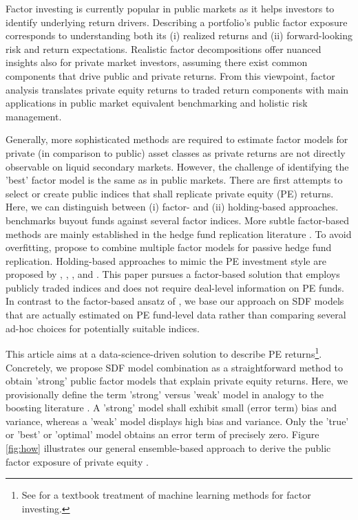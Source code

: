 \documentclass[12pt]{article}
\begin{document}
Factor investing is currently popular in public markets as it helps investors to identify underlying return drivers.
Describing a portfolio's public factor exposure corresponds to understanding both its (i) realized returns and (ii) forward-looking risk and return expectations.
Realistic factor decompositions offer nuanced insights also for private market investors, assuming there exist common components that drive public and private returns.
From this viewpoint, factor analysis translates private equity returns to traded return components with main applications in public market equivalent benchmarking and holistic risk management.

Generally, more sophisticated methods are required to estimate factor models for private (in comparison to public) asset classes as private returns are not directly observable on liquid secondary markets.
However, the challenge of identifying the 'best' factor model is the same as in public markets.
There are first attempts to select or create public indices that shall replicate private equity (PE) returns.
Here, we can distinguish between (i) factor- and (ii) holding-based approaches.
\cite{P14} benchmarks buyout funds against several factor indices.
More subtle factor-based methods are mainly established in the hedge fund replication literature \citep{TV08,W14}.
To avoid overfitting, \cite{OST17} propose to combine multiple factor models for passive hedge fund replication.
Holding-based approaches to mimic the PE investment style are proposed by \cite{LSSL16}, \cite{S17}, \cite{MS19}, and \cite{PP19}.
This paper pursues a factor-based solution that employs publicly traded indices and does not require deal-level information on PE funds.
In contrast to the factor-based ansatz of \cite{P14}, we base our approach on SDF models that are actually estimated on PE fund-level data rather than comparing several ad-hoc choices for potentially suitable indices.

This article aims at a data-science-driven solution to describe PE returns\footnote{See \cite{CG23} for a textbook treatment of machine learning methods for factor investing.}.
Concretely, we propose SDF model combination as a straightforward method to obtain 'strong' public factor models that explain private equity returns.
Here, we provisionally define the term 'strong' versus 'weak' model in analogy to the boosting literature \citep{S90}.
A 'strong' model shall exhibit small (error term) bias and variance, whereas a 'weak' model displays high bias and variance.
Only the 'true' or 'best' or 'optimal' model obtains an error term of precisely zero.
Figure \ref{fig:how} illustrates our general ensemble-based approach to derive the public factor exposure of private equity \citep{B12}.
\end{document}
